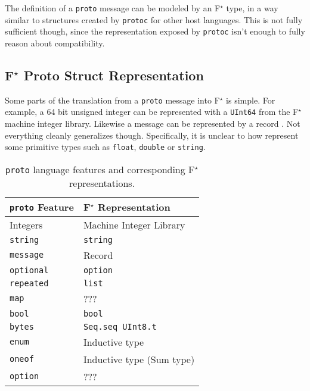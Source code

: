 \documentclass[11pt]{article}
\newcommand{\fstar}{F\(^\star\)}
\theoremstyle{definition}
\begin{document}
The definition of a \texttt{proto} message can be modeled by an \fstar{} type,
in a way similar to structures created by \texttt{protoc} for other host
languages. This is not fully sufficient though, since the representation
exposed by \texttt{protoc} isn't enough to fully reason about compatibility.

\subsection{\fstar{} Proto Struct Representation}

Some parts of the translation from a \texttt{proto} message
\autocite{LanguageGuideProto} into \fstar{} is simple. For example, a 64 bit
unsigned integer can be represented with a \texttt{UInt64} from the \fstar{}
machine integer library. Likewise a message can be represented by a record
\autocite{swamy2023proof}. Not everything cleanly generalizes
though. Specifically, it is unclear to how represent some primitive types such
as \texttt{float}, \texttt{double} or \texttt{string}.

\begin{table}[H]
	\centering
	\begin{tabular}{ll}
		\toprule
		\texttt{proto} Feature & \fstar{} Representation   \\
		\midrule
		Integers               & Machine Integer Library   \\
		\texttt{string}        & \texttt{string}           \\
		\texttt{message}       & Record                    \\
		\texttt{optional}      & \texttt{option}           \\
		\texttt{repeated}      & \texttt{list}             \\
		\texttt{map}           & ???                       \\
		\texttt{bool}          & \texttt{bool}             \\
		\texttt{bytes}         & \texttt{Seq.seq UInt8.t}  \\
		\texttt{enum}          & Inductive type            \\
		\texttt{oneof}         & Inductive type (Sum type) \\
		\texttt{option}        & ???                       \\
		\bottomrule
	\end{tabular}

	\vspace{4mm}
	\caption[]{\texttt{proto} language features and corresponding \fstar{} representations.}
\end{table}
\end{document}
